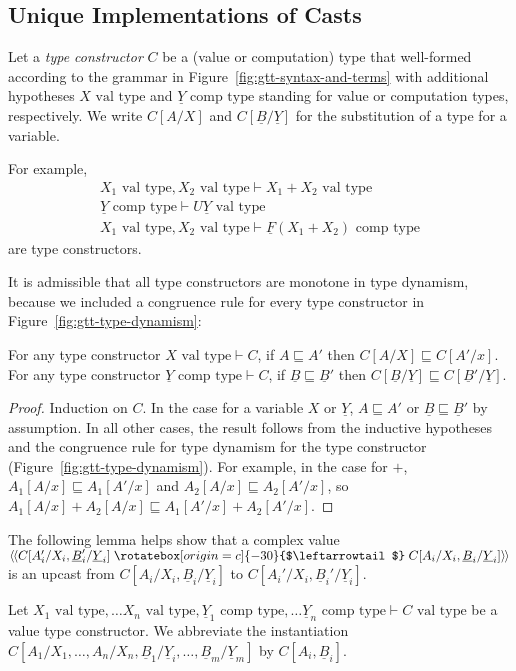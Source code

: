 \documentclass[acmsmall,screen,12pt]{acmart}
\renewcommand{\u}{\underline}
\newcommand{\vtype}{\,\,\text{val type}}
\newcommand{\ctype}{\,\,\text{comp type}}
\newcommand{\ltdyn}{\sqsubseteq}
\newcommand{\uarrow}{\mathrel{\rotatebox[origin=c]{-30}{$\leftarrowtail$}}}
\newcommand{\defupcast}[2]{\langle\kern-1ex~\langle{#2}\uarrow{#1}\rangle\kern-1ex~\rangle}
\begin{document}
\subsection{Unique Implementations of Casts}

\begin{longonly}
\begin{definition}
  Let a \emph{type constructor} $C$ be a (value or computation) type that
  well-formed according to the grammar in Figure~\ref{fig:gtt-syntax-and-terms} with
  additional hypotheses $X \vtype$ and $\u Y \ctype$ standing for value
  or computation types, respectively.  We write $C[A/X]$ and $C[\u B/\u
    Y]$ for the substitution of a type for a variable.  
\end{definition}
For example,
\[
\begin{array}{l}
  X_1 \vtype, X_2 \vtype \vdash X_1 + X_2 \vtype \\
  \u Y \ctype \vdash U \u Y \vtype \\
  X_1 \vtype, X_2 \vtype \vdash \u F(X_1 + X_2) \ctype
\end{array}
\]
are type constructors.

It is admissible that all type constructors are monotone in type
dynamism, because we included a congruence rule for every type
constructor in Figure~\ref{fig:gtt-type-dynamism}:  

\begin{lemma}
  For any type constructor $X \vtype \vdash C$, if $A \ltdyn A'$ then
  $C[A/X] \ltdyn C[A'/x]$.  For any type constructor $\u Y \ctype \vdash
  C$, if $\u B \ltdyn \u B'$ then $C[\u B/\u Y] \ltdyn C[\u B'/\u Y]$.
\end{lemma}
\begin{proof}
Induction on $C$.  In the case for a variable $X$ or $\u Y$, $A \ltdyn
A'$ or $\u B \ltdyn \u B'$ by assumption.  In all other cases, the
result follows from the inductive hypotheses and the congruence rule for
type dynamism for the type constructor
(Figure~\ref{fig:gtt-type-dynamism}).  For example, in the case for $+$,
$A_1[A/x] \ltdyn A_1[A'/x]$ and $A_2[A/x] \ltdyn A_2[A'/x]$, so
$A_1[A/x] + A_2[A/x] \ltdyn A_1[A'/x] + A_2[A'/x]$.
\end{proof}

The following lemma helps show that a complex value
$\defupcast{C[A_i/X_i,\u B_i/\u Y_i]}{C[A_i'/X_i,\u B_i'/\u Y_i]}$ is an
upcast from $C[A_i/X_i,\u B_i/\u Y_i]$ to $C[A_i'/X_i,\u B_i'/\u Y_i]$.
\begin{lemma} \label{lem:upcast}
  Let $X_1 \vtype, \ldots X_n \vtype, \u Y_1 \ctype, \ldots \u Y_n
  \ctype \vdash C \vtype$ be a value type constructor.  We abbreviate
  the instantiation \\ $C[A_1/X_1,\ldots,A_n/X_n,\u B_1/\u Y_i,\ldots,\u
    B_m/\u Y_m]$ by $C[A_i,\u B_i]$.


\end{lemma}
\end{longonly}
\end{document}
